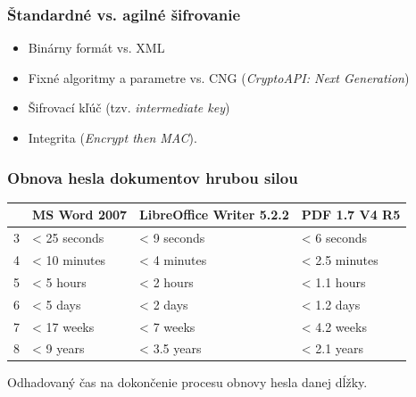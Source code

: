 \documentclass[xcolor=dvipsnames]{beamer}
\begin{document}

\begin{frame}
	\frametitle{Štandardné vs. agilné šifrovanie}
	\begin{itemize}
		\item Binárny formát vs. XML
		\item Fixné algoritmy a parametre vs. CNG (\textit{CryptoAPI: Next Generation})
		\item Šifrovací kľúč (tzv. \textit{intermediate key})
		\item Integrita (\textit{Encrypt then MAC}). 
	\end{itemize}
\end{frame}


\begin{frame}
	\frametitle{Obnova hesla dokumentov hrubou silou}
	
	 \begin{table}[h]
	\centering
	\begin{tabular}{|l|l|l|l|}
           \hline
		&\textbf{MS Word 2007}&\textbf{LibreOffice Writer 5.2.2}&\textbf{PDF 1.7 V4 R5}\\
	\hline
		3&< 25 seconds&< 9 seconds&< 6 seconds\\
	\hline
		4&< 10 minutes&< 4 minutes&< 2.5 minutes\\
	\hline
		5&< 5 hours& < 2 hours&< 1.1 hours\\
	\hline
		6&< 5 days&< 2 days&< 1.2 days\\
	\hline
		7&< 17 weeks&< 7 weeks&< 4.2 weeks\\
	\hline
		8&< 9 years&< 3.5 years&< 2.1 years\\
	\hline
           \end{tabular}
	\end{table}
\begin{center}	
	\vspace{-5mm}
	\scriptsize{Odhadovaný čas na dokončenie procesu obnovy hesla danej dĺžky.}
\end{center}
\end{frame}

\end{document}
